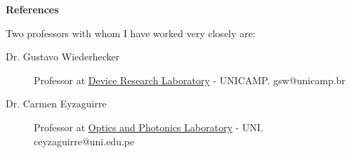 \documentclass[letterpaper, 12pt]{article}[leftmargin=*]
\renewcommand{\section}[2]{
  \colorbox{secondary}{\color{white}\raggedbottom\normalsize\textbf{{#1}{\hspace{7pt}#2}}}
}
\begin{document}
\section{\faTripadvisor}{References}

\vspace{5pt}
Two professors with whom I have worked very closely are:
\begin{description}
	\item[Dr. Gustavo Wiederhecker] Professor at \href{https://sites.ifi.unicamp.br/lpd/}{Device Research Laboratory} - UNICAMP. \href{gsw@unicamp.br}{\faEnvelopeO} gsw@unicamp.br
	\vspace{-0.15cm}
	\item[Dr. Carmen Eyzaguirre] Professor at \href{https://fc.uni.edu.pe/fc/index.php/noticias-secundarias/item/12-eyzaguirre-gorvenia-carmen}{Optics and Photonics Laboratory} - UNI. \href{ceyzaguirre@uni.edu.pe}{\faEnvelopeO} ceyzaguirre@uni.edu.pe
\end{description}
\end{document}
